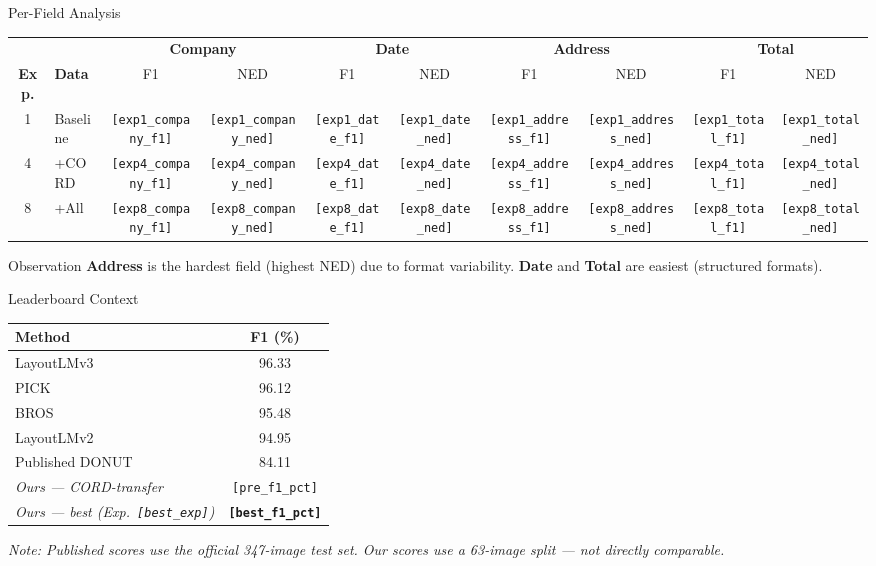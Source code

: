 \documentclass[aspectratio=169,11pt]{beamer}
\newcommand{\VAR}[1]{\texttt{[#1]}\xspace}
\newcommand{\hlnum}[1]{\textcolor{AccentTeal}{\textbf{#1}}}
\begin{document}
\begin{frame}{Per-Field Analysis}
  \centering
  {\footnotesize
  \begin{tabular}{@{}clcccccccc@{}}
    \toprule
    & &
    \multicolumn{2}{c}{\textbf{Company}} &
    \multicolumn{2}{c}{\textbf{Date}} &
    \multicolumn{2}{c}{\textbf{Address}} &
    \multicolumn{2}{c}{\textbf{Total}} \\
    \cmidrule(lr){3-4}\cmidrule(lr){5-6}\cmidrule(lr){7-8}\cmidrule(lr){9-10}
    \textbf{Exp.} & \textbf{Data} & F1 & NED & F1 & NED & F1 & NED & F1 & NED \\
    \midrule
    1 & Baseline & \VAR{exp1_company_f1} & \VAR{exp1_company_ned} & \VAR{exp1_date_f1} & \VAR{exp1_date_ned} & \VAR{exp1_address_f1} & \VAR{exp1_address_ned} & \VAR{exp1_total_f1} & \VAR{exp1_total_ned} \\
    4 & +CORD    & \VAR{exp4_company_f1} & \VAR{exp4_company_ned} & \VAR{exp4_date_f1} & \VAR{exp4_date_ned} & \VAR{exp4_address_f1} & \VAR{exp4_address_ned} & \VAR{exp4_total_f1} & \VAR{exp4_total_ned} \\
    8 & +All     & \VAR{exp8_company_f1} & \VAR{exp8_company_ned} & \VAR{exp8_date_f1} & \VAR{exp8_date_ned} & \VAR{exp8_address_f1} & \VAR{exp8_address_ned} & \VAR{exp8_total_f1} & \VAR{exp8_total_ned} \\
    \bottomrule
  \end{tabular}
  }

  \vspace{0.4cm}
  \begin{alertblock}{Observation}
    \textbf{Address} is the hardest field (highest NED) due to
    format variability. \textbf{Date} and \textbf{Total} are
    easiest (structured formats).
  \end{alertblock}
\end{frame}

\begin{frame}{Leaderboard Context}
  \centering
  \begin{tabular}{@{}lc@{}}
    \toprule
    \textbf{Method} & \textbf{F1 (\%)} \\
    \midrule
    LayoutLMv3     & 96.33 \\
    PICK           & 96.12 \\
    BROS           & 95.48 \\
    LayoutLMv2     & 94.95 \\
    Published DONUT & 84.11 \\
    \midrule
    \textit{Ours --- CORD-transfer}         & \VAR{pre_f1_pct} \\
    \textit{Ours --- best (Exp.~\VAR{best_exp})} & \hlnum{\VAR{best_f1_pct}} \\
    \bottomrule
  \end{tabular}

  \vspace{0.4cm}
  {\small\textit{Note: Published scores use the official 347-image test set.
  Our scores use a 63-image split --- not directly comparable.}}
\end{frame}
\end{document}
